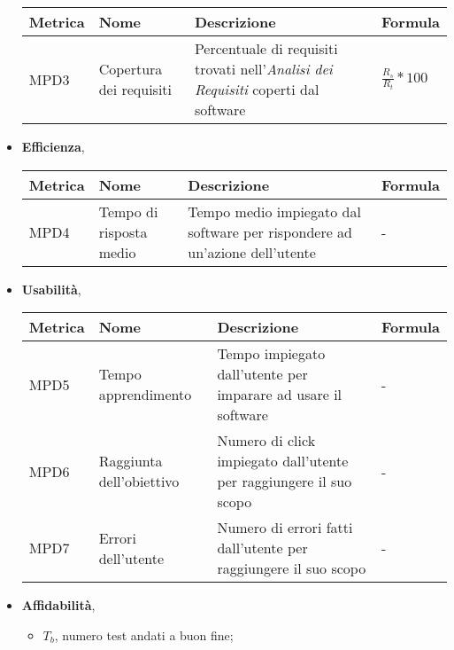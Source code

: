 \begin{itemize}
\begin{center}
                \begin{tabular}{|p{2cm}|p{3.5cm}|p{5.5cm}|p{3.5cm}|} \hline
                  \textbf{Metrica} & \textbf{Nome} & \textbf{Descrizione} & \textbf{Formula}    \\ \hline
                    MPD3 & Copertura dei requisiti & Percentuale di requisiti trovati nell'\textit{Analisi dei Requisiti} coperti dal software  & $\frac{R_s}{R_t}*100$  \\ \hline
                \end{tabular}
            \end{center}
        \item \textbf{Efficienza},
            \begin{center}
                \begin{tabular}{|p{2cm}|p{3.5cm}|p{5.5cm}|p{3.5cm}|} \hline
                  \textbf{Metrica} & \textbf{Nome} & \textbf{Descrizione} & \textbf{Formula}    \\ \hline
                    MPD4 & Tempo di risposta medio & Tempo medio impiegato dal software per rispondere ad un'azione dell'utente & -  \\ \hline
                \end{tabular}
            \end{center}
        \item \textbf{Usabilità},
            \begin{center}
                \begin{tabular}{|p{2cm}|p{3.5cm}|p{5.5cm}|p{3.5cm}|} \hline
                  \textbf{Metrica} & \textbf{Nome} & \textbf{Descrizione} & \textbf{Formula}    \\ \hline
                  MPD5 & Tempo apprendimento & Tempo impiegato dall'utente per imparare ad usare il software & -  \\ \hline
                  MPD6 & Raggiunta dell'obiettivo & Numero di click impiegato dall'utente per raggiungere il suo scopo & -  \\ \hline
                  MPD7 & Errori dell'utente & Numero di errori fatti dall'utente per raggiungere il suo scopo & -  \\ \hline
                \end{tabular}
            \end{center}
        \item \textbf{Affidabilità},
            \begin{itemize}
                \item $T_b$, numero test andati a buon fine;

\end{itemize}
\end{itemize}
